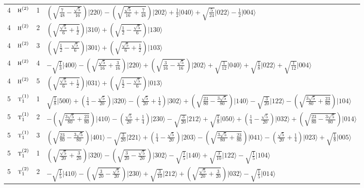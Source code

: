 \documentclass[11pt]{article}
\newcommand{\irr}[1]{\text{\normalfont\scshape #1}}
\newcommand{\occ}[1]{\lvert #1\rangle}
\begin{document}
\begin{longtable}{c l c p{}}
4 & $\irr{h}^{(2)}$ & 1 & $(\sqrt{\frac{7}{48} - \frac{\sqrt{5}}{16}})\occ{220}-(\sqrt{\frac{\sqrt{5}}{16} + \frac{7}{48}})\occ{202}+\tfrac{1}{2}\occ{040}+\sqrt{\tfrac{5}{24}}\occ{022}-\tfrac{1}{2}\occ{004}$\\
4 & $\irr{h}^{(2)}$ & 2 & $(\sqrt{\frac{\sqrt{5}}{6} + \frac{1}{2}})\occ{310}+(\sqrt{\frac{1}{2} - \frac{\sqrt{5}}{6}})\occ{130}$\\
4 & $\irr{h}^{(2)}$ & 3 & $(\sqrt{\frac{1}{2} - \frac{\sqrt{5}}{6}})\occ{301}+(\sqrt{\frac{\sqrt{5}}{6} + \frac{1}{2}})\occ{103}$\\
4 & $\irr{h}^{(2)}$ & 4 & $-\sqrt{\tfrac{1}{3}}\occ{400}-(\sqrt{\frac{\sqrt{5}}{16} + \frac{3}{16}})\occ{220}+(\sqrt{\frac{3}{16} - \frac{\sqrt{5}}{16}})\occ{202}+\sqrt{\tfrac{1}{12}}\occ{040}+\sqrt{\tfrac{1}{8}}\occ{022}+\sqrt{\tfrac{1}{12}}\occ{004}$\\
4 & $\irr{h}^{(2)}$ & 5 & $(\sqrt{\frac{\sqrt{5}}{6} + \frac{1}{2}})\occ{031}+(\sqrt{\frac{1}{2} - \frac{\sqrt{5}}{6}})\occ{013}$\\
\hline
5 & $\irr{t}_{1}^{(1)}$ & 1 & $\sqrt{\tfrac{1}{8}}\occ{500}+(\frac{1}{4} - \frac{\sqrt{5}}{20})\occ{320}-(\frac{\sqrt{5}}{20} + \frac{1}{4})\occ{302}+(\sqrt{\frac{23}{80} - \frac{3 \sqrt{5}}{80}})\occ{140}-\sqrt{\tfrac{3}{20}}\occ{122}-(\sqrt{\frac{3 \sqrt{5}}{80} + \frac{23}{80}})\occ{104}$\\
5 & $\irr{t}_{1}^{(1)}$ & 2 & $-(\sqrt{\frac{3 \sqrt{5}}{80} + \frac{23}{80}})\occ{410}-(\frac{\sqrt{5}}{20} + \frac{1}{4})\occ{230}-\sqrt{\tfrac{3}{20}}\occ{212}+\sqrt{\tfrac{1}{8}}\occ{050}+(\frac{1}{4} - \frac{\sqrt{5}}{20})\occ{032}+(\sqrt{\frac{23}{80} - \frac{3 \sqrt{5}}{80}})\occ{014}$\\
5 & $\irr{t}_{1}^{(1)}$ & 3 & $(\sqrt{\frac{23}{80} - \frac{3 \sqrt{5}}{80}})\occ{401}-\sqrt{\tfrac{3}{20}}\occ{221}+(\frac{1}{4} - \frac{\sqrt{5}}{20})\occ{203}-(\sqrt{\frac{3 \sqrt{5}}{80} + \frac{23}{80}})\occ{041}-(\frac{\sqrt{5}}{20} + \frac{1}{4})\occ{023}+\sqrt{\tfrac{1}{8}}\occ{005}$\\
5 & $\irr{t}_{1}^{(2)}$ & 1 & $(\sqrt{\frac{\sqrt{5}}{20} + \frac{3}{20}})\occ{320}-(\sqrt{\frac{3}{20} - \frac{\sqrt{5}}{20}})\occ{302}-\sqrt{\tfrac{1}{5}}\occ{140}+\sqrt{\tfrac{3}{10}}\occ{122}-\sqrt{\tfrac{1}{5}}\occ{104}$\\
5 & $\irr{t}_{1}^{(2)}$ & 2 & $-\sqrt{\tfrac{1}{5}}\occ{410}-(\sqrt{\frac{3}{20} - \frac{\sqrt{5}}{20}})\occ{230}+\sqrt{\tfrac{3}{10}}\occ{212}+(\sqrt{\frac{\sqrt{5}}{20} + \frac{3}{20}})\occ{032}-\sqrt{\tfrac{1}{5}}\occ{014}$\\

\end{longtable}
\end{document}

